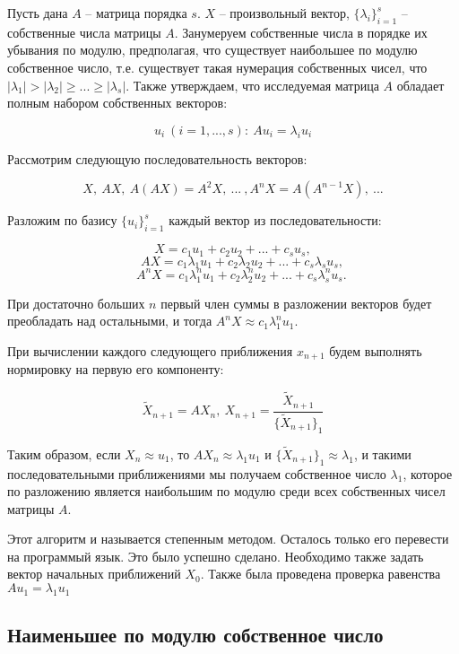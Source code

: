 \documentclass[12pt,a4paper]{article}
\begin{document}
Пусть дана $A$ -- матрица порядка $s$. $X$ -- произвольный вектор, $\{\lambda_i\}_{i=1}^s$ -- собственные числа матрицы $A$. Занумеруем собственные числа в порядке их убывания по модулю, предполагая, что существует наибольшее по модулю собственное число, т.е. существует такая нумерация собственных чисел, что $|\lambda_1| > |\lambda_2| \geq ... \geq |\lambda_s|$. Также утверждаем, что исследуемая матрица $A$ обладает полным набором собственных векторов:

$$ u_i \ (i=1,...,s): \ Au_i = \lambda_i u_i $$

Рассмотрим следующую последовательность векторов:

$$ X, \ AX, \ A(AX)=A^2X, \ ... \ , A^nX=A(A^{n-1}X), \ ...  $$

\newpage

Разложим по базису $\{u_i\}_{i=1}^s$ каждый вектор из последовательности:

$$ X  =  c_1 u_1 + c_2 u_2 + ... + c_s u_s, $$
$$\ \ \ \ \ \ \, AX=c_1\lambda_1u_1 + c_2\lambda_2u_2 + ... + c_s\lambda_su_s, $$
$$
\ \ \ \ \ \
A^nX = c_1 \lambda_1^n u_1 + c_2 \lambda_2^n u_2 + ... + c_s \lambda_s^n u_s.
$$


При достаточно больших $n$ первый член суммы в разложении векторов будет преобладать над остальными, и тогда $A^nX \approx c_1 \lambda_1^n u_1$.

При вычислении каждого следующего приближения $x_{n+1}$ будем выполнять нормировку на первую его компоненту: 

$$ \tilde X_{n+1} = AX_n, \ X_{n+1} = \frac{\tilde X_{n+1}}{\{\tilde X_{n+1}\}_1} $$

Таким образом, если $ X_n \approx u_1 $, то $ AX_n \approx \lambda_1 u_1 $ и $\{\tilde X_{n+1}\}_1 \approx \lambda_1 $, и такими последовательными приближениями мы получаем собственное число $ \lambda_1 $, которое по разложению является наибольшим по модулю среди всех собственных чисел матрицы $A$. 

Этот алгоритм и называется степенным методом. Осталось только его перевести на программый язык. Это было успешно сделано. Необходимо также задать вектор начальных приближений $X_0$. Также была проведена проверка равенства $Au_1 = \lambda_1 u_1$

\subsection{Наименьшее по модулю собственное число}
\end{document}
